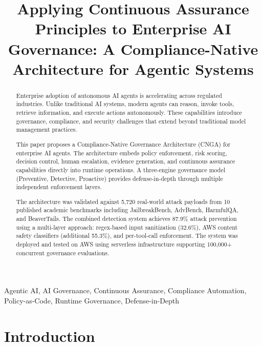 \documentclass[conference]{IEEEtran}
\begin{document}
\title{Applying Continuous Assurance Principles to Enterprise AI Governance: A Compliance-Native Architecture for Agentic Systems}

\author{
}

\maketitle

\begin{abstract}

Enterprise adoption of autonomous AI agents is accelerating across regulated industries. Unlike traditional AI systems, modern agents can reason, invoke tools, retrieve information, and execute actions autonomously. These capabilities introduce governance, compliance, and security challenges that extend beyond traditional model management practices.

This paper proposes a Compliance-Native Governance Architecture (CNGA) for enterprise AI agents. The architecture embeds policy enforcement, risk scoring, decision control, human escalation, evidence generation, and continuous assurance capabilities directly into runtime operations. A three-engine governance model (Preventive, Detective, Proactive) provides defense-in-depth through multiple independent enforcement layers.

The architecture was validated against 5,720 real-world attack payloads from 10 published academic benchmarks including JailbreakBench, AdvBench, HarmfulQA, and BeaverTails. The combined detection system achieves 87.9\% attack prevention using a multi-layer approach: regex-based input sanitization (32.6\%), AWS content safety classifiers (additional 55.3\%), and per-tool-call enforcement. The system was deployed and tested on AWS using serverless infrastructure supporting 100,000+ concurrent governance evaluations.

\end{abstract}

\begin{IEEEkeywords}
Agentic AI, AI Governance, Continuous Assurance, Compliance Automation, Policy-as-Code, Runtime Governance, Defense-in-Depth
\end{IEEEkeywords}

\section{Introduction}
\end{document}
